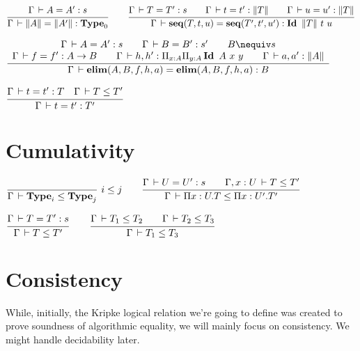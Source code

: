 \documentclass[a4paper,english]{lipics-utf8x}
\begin{document}
  \begin{center}
  \(
    \ru{\Gamma \der A = A' : s
      }{\Gamma \der \squash{A} = \squash{A'} : \Type_0}
    \qquad
    \ru{\Gamma \der T = T' : s \qquad
        \Gamma \der t = t' : \squash{T} \qquad
        \Gamma \der u = u' : \squash{T}
      }{\Gamma \der \seq(T,t,u) = \seq(T',t',u') : \Id \squash{T}\ t\ u}
  \)
  \end{center}

  \begin{center}
  \(
    \dru{\Gamma \der A = A' : s \qquad
         \Gamma \der B = B' : s' \qquad
         B \nequiv s
       }{\Gamma \der f = f' : A \to B \qquad
         \Gamma \der h, h' : \Pi_{x:A} \Pi_{y:A} \Id A\ x\ y \qquad
         \Gamma \der a, a' : \squash{A}
       }{\Gamma \der \elim(A,B,f,h,a) = \elim(A,B,f,h,a) : B}
  \)
  \end{center}


  \begin{center}
  \(
    \ru{\Gamma \der t = t' : T \quad
        \Gamma \der T \le T'
      }{\Gamma \der t = t' : T'}
  \)
  \end{center}

  \section{Cumulativity}

  \begin{center}
  \(
    \rux{}{\Gamma \der \Type_i \le \Type_j}{i \le j}
    \qquad
    \ru{\Gamma \der U = U' : s \qquad
        \Gamma, x:U \der T \le T'
      }{\Gamma \der \Pi x:U.T \le \Pi x:U'.T'}
  \)
  \end{center}

  \begin{center}
  \(
    \ru{\Gamma \der T = T' : s
      }{\Gamma \der T \le T'}
    \qquad
    \ru{\Gamma \der T_1 \le T_2 \qquad
        \Gamma \der T_2 \le T_3
      }{\Gamma \der T_1 \le T_3}
  \)
  \end{center}

  \section{Consistency}

  While, initially, the Kripke logical relation we're going to define was
  created to prove soundness of algorithmic equality, we will mainly focus
  on consistency. We might handle decidability later.
\end{document}
